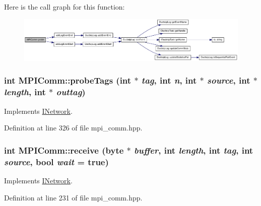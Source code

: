 Here is the call graph for this function:\nopagebreak
\begin{figure}[H]
\begin{center}
\leavevmode
\includegraphics[width=420pt]{class_m_p_i_comm_a1c1a72b9cf6cac8a5af0e8dc6a085c87_cgraph}
\end{center}
\end{figure}
\hypertarget{class_m_p_i_comm_a5e2fdc3d30c9e2ef04fc81fa99e8cd3f}{
\subsubsection[{probeTags}]{\setlength{\rightskip}{0pt plus 5cm}int MPIComm::probeTags (int $\ast$ {\em tag}, \/  int {\em n}, \/  int $\ast$ {\em source}, \/  int $\ast$ {\em length}, \/  int $\ast$ {\em outtag})}}
\label{class_m_p_i_comm_a5e2fdc3d30c9e2ef04fc81fa99e8cd3f}


Implements \hyperlink{class_i_network_a85b398c3932251d6c0d9698004eb01e7}{INetwork}.

Definition at line 326 of file mpi\_\-comm.hpp.\hypertarget{class_m_p_i_comm_abdd86a365a50571e7a46e8593c45977b}{
\subsubsection[{receive}]{\setlength{\rightskip}{0pt plus 5cm}int MPIComm::receive ({\bf byte} $\ast$ {\em buffer}, \/  int {\em length}, \/  int {\em tag}, \/  int {\em source}, \/  bool {\em wait} = {\ttfamily true})}}
\label{class_m_p_i_comm_abdd86a365a50571e7a46e8593c45977b}


Implements \hyperlink{class_i_network_a6578b7160209dfc342be9b5658621625}{INetwork}.

Definition at line 231 of file mpi\_\-comm.hpp.

